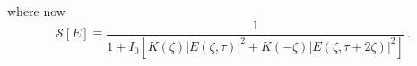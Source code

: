 where now
\begin{equation}
    \mathcal{S}[E] \equiv \frac{1}{1 + I_0 \left[K(\zeta) \left|E(\zeta, \tau)\right|^2 + K(-\zeta) \left|E(\zeta, \tau + 2 \zeta)\right|^2\right]}\, .
\end{equation}


